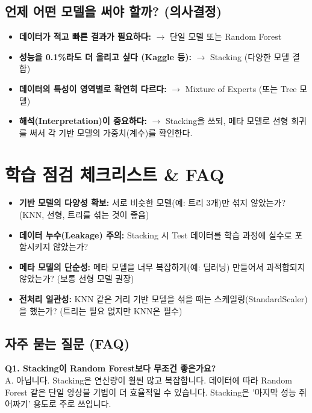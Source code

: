 \documentclass[11pt,a4paper]{book}
\theoremstyle{definition}
\begin{document}
\subsection{언제 어떤 모델을 써야 할까? (의사결정)}
\begin{itemize}
    \item \textbf{데이터가 적고 빠른 결과가 필요하다:} $\rightarrow$ 단일 모델 또는 Random Forest
    \item \textbf{성능을 0.1\%라도 더 올리고 싶다 (Kaggle 등):} $\rightarrow$ Stacking (다양한 모델 결합)
    \item \textbf{데이터의 특성이 영역별로 확연히 다르다:} $\rightarrow$ Mixture of Experts (또는 Tree 모델)
    \item \textbf{해석(Interpretation)이 중요하다:} $\rightarrow$ Stacking을 쓰되, 메타 모델로 선형 회귀를 써서 각 기반 모델의 가중치(계수)를 확인한다.
\end{itemize}


\section{학습 점검 체크리스트 \& FAQ}

\begin{itemize}[label=$\square$]
    \item \textbf{기반 모델의 다양성 확보:} 서로 비슷한 모델(예: 트리 3개)만 섞지 않았는가? (KNN, 선형, 트리를 섞는 것이 좋음)
    \item \textbf{데이터 누수(Leakage) 주의:} Stacking 시 Test 데이터를 학습 과정에 실수로 포함시키지 않았는가?
    \item \textbf{메타 모델의 단순성:} 메타 모델을 너무 복잡하게(예: 딥러닝) 만들어서 과적합되지 않았는가? (보통 선형 모델 권장)
    \item \textbf{전처리 일관성:} KNN 같은 거리 기반 모델을 섞을 때는 스케일링(StandardScaler)을 했는가? (트리는 필요 없지만 KNN은 필수)
\end{itemize}

\vspace{0.5cm}

\subsection{자주 묻는 질문 (FAQ)}

\textbf{Q1. Stacking이 Random Forest보다 무조건 좋은가요?} \\
A. 아닙니다. Stacking은 연산량이 훨씬 많고 복잡합니다. 데이터에 따라 Random Forest 같은 단일 앙상블 기법이 더 효율적일 수 있습니다. Stacking은 '마지막 성능 쥐어짜기' 용도로 주로 쓰입니다.
\end{document}
